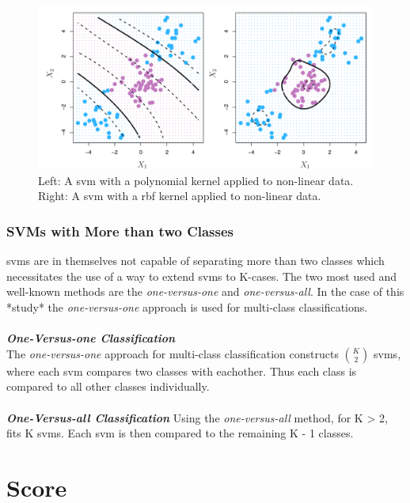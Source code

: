 \documentclass[11pt]{article}
\begin{document}
\begin{figure}[ht]
  \centering
  \includegraphics[width=12cm]{graphics/9_9.pdf}
  \caption{Left: A \gls{svm} with a polynomial kernel applied to non-linear data. Right: A \gls{svm} with a \gls{rbf} kernel applied to non-linear data.}
\end{figure}

\subsubsection{SVMs with More than two Classes}
\glspl{svm} are in themselves not capable of separating more than two classes which necessitates the use of a way to extend \glspl{svm} to K-cases. The two most used and well-known methods are the \textit{one-versus-one} and \textit{one-versus-all}. In the case of this *study* the \textit{one-versus-one} approach is used for multi-class classifications\cite{jamesSupportVectorMachines}.\\
\\
\textbf{\textit{One-Versus-one Classification}}\\
The \textit{one-versus-one} approach for multi-class classification constructs $\binom{K}{2}$ \glspl{svm}, where each \gls{svm} compares two classes with eachother. Thus each class is compared to all other classes individually.\cite{jamesSupportVectorMachines}\\
\\
\textbf{\textit{One-Versus-all Classification}}
Using the \textit{one-versus-all} method, for K > 2, fits K \glspl{svm}. Each \gls{svm} is then compared to the remaining K - 1 classes.\cite{jamesSupportVectorMachines}
\section{Score}
\end{document}
